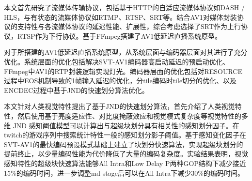 
\begin{summary}

  本文首先研究了流媒体传输协议，包括基于HTTP的自适应流媒体协议如DASH / HLS，与有状态的流媒体协议如RTMP、RTSP、SRT等。结合AV1对媒体封装协议的支持性与各流媒体协议的延迟性能、扩展性，综合考虑选择了SRT作为上行协议，RTSP作为下行协议。基于FFmpeg搭建了AV1低延迟直播系统原型。

  对于所搭建的AV1低延迟直播系统原型，从系统层面与编码器层面对其进行了充分优化。系统层面的优化包括解决SVT-AV1编码器高启动延迟的预启动优化、FFmpeg中AV1的RTP封装逻辑实现灯光。编码器层面的优化包括对RESOURCE过程中EOS机制导致的1帧输入延迟的优化，分tile编码时tile切分的优化、以及ENCDEC过程中基于JND的快速划分算法优化。

  本文针对人类视觉特性提出了基于JND的快速划分算法，首先介绍了人类视觉特性，然后使用基于亮度适应性、对比度掩蔽效应和视觉模式复杂度等视觉特性的多维 JND 感知阈值模型可以计算出与超级块划分具有相关性的感知划分因子。在twitch的游戏序列中搜索统计特性一般的感知划分影子阈值。基于感知变化因子在SVT-AV1的最快编码预设模式基础上建立了块划分快速算法，实现超级块划分的提前终止，以少量编码性能为代价降低了大量的编码复杂度。实验结果表明，视觉感知特性的超级块快速算法能够All Intra和Low Delay P两种GOP结构下减少接近15\%的编码时间，进一步调整md-stage后可以在All Intra下减少30\%的编码时间。




\end{summary}
